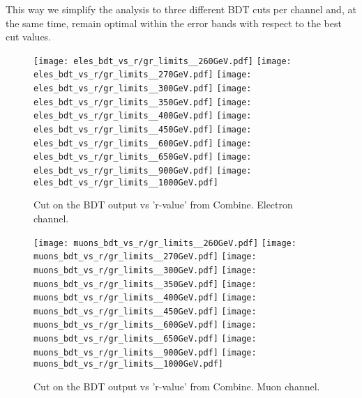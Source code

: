 This way we simplify the analysis to three different BDT cuts per channel and, at the same time, remain optimal within the error bands with respect  to the best cut values. 

\begin{figure}[!htb]%
\texttt{[image: eles\_bdt\_vs\_r/gr\_limits\_\_260GeV.pdf]}
\texttt{[image: eles\_bdt\_vs\_r/gr\_limits\_\_270GeV.pdf]}
\texttt{[image: eles\_bdt\_vs\_r/gr\_limits\_\_300GeV.pdf]}
\texttt{[image: eles\_bdt\_vs\_r/gr\_limits\_\_350GeV.pdf]}
\texttt{[image: eles\_bdt\_vs\_r/gr\_limits\_\_400GeV.pdf]}
\texttt{[image: eles\_bdt\_vs\_r/gr\_limits\_\_450GeV.pdf]}
\texttt{[image: eles\_bdt\_vs\_r/gr\_limits\_\_600GeV.pdf]}
\texttt{[image: eles\_bdt\_vs\_r/gr\_limits\_\_650GeV.pdf]}
\texttt{[image: eles\_bdt\_vs\_r/gr\_limits\_\_900GeV.pdf]}
\hspace{1.9cm}
\texttt{[image: eles\_bdt\_vs\_r/gr\_limits\_\_1000GeV.pdf]}
\caption{ Cut on the BDT output vs 'r-value' from Combine. Electron channel.}
\label{fig:ele_bdt_vs_r}                                                       
\end{figure}



\begin{figure}[!htb]%
\texttt{[image: muons\_bdt\_vs\_r/gr\_limits\_\_260GeV.pdf]}
\texttt{[image: muons\_bdt\_vs\_r/gr\_limits\_\_270GeV.pdf]}
\texttt{[image: muons\_bdt\_vs\_r/gr\_limits\_\_300GeV.pdf]}
\texttt{[image: muons\_bdt\_vs\_r/gr\_limits\_\_350GeV.pdf]}
\texttt{[image: muons\_bdt\_vs\_r/gr\_limits\_\_400GeV.pdf]}
\texttt{[image: muons\_bdt\_vs\_r/gr\_limits\_\_450GeV.pdf]}
\texttt{[image: muons\_bdt\_vs\_r/gr\_limits\_\_600GeV.pdf]}
\texttt{[image: muons\_bdt\_vs\_r/gr\_limits\_\_650GeV.pdf]}
\texttt{[image: muons\_bdt\_vs\_r/gr\_limits\_\_900GeV.pdf]}
\hspace{1.9cm}
\texttt{[image: muons\_bdt\_vs\_r/gr\_limits\_\_1000GeV.pdf]}
\caption{ Cut on the BDT output vs 'r-value' from Combine. Muon channel.}
\label{fig:muon_bdt_vs_r}           
\end{figure}

